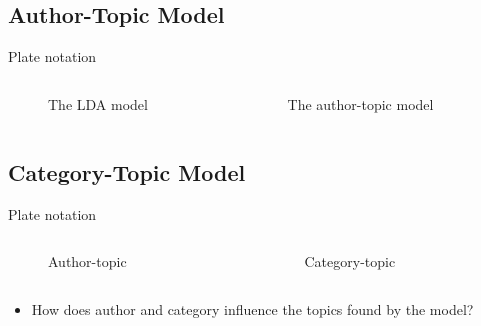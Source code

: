 \subsection{Author-Topic Model}

\begin{frame}{\insertsubsection}{Plate notation}
	\begin{columns}
		\begin{column}{0.45\textwidth}
			\begin{figure}
				\resizebox{\textwidth}{!}{%
				
			}
			\caption*{The LDA model}
			\end{figure}
		\end{column}
		\begin{column}{0.45\textwidth}
			\begin{figure}
				\resizebox{\textwidth}{!}{%
					
				}
				\caption*{The author-topic model}
			\end{figure}
		\end{column}
	\end{columns}
\end{frame}

\subsection{Category-Topic Model}
\begin{frame}{\insertsubsection}{Plate notation}
	\begin{columns}
		\begin{column}{0.45\textwidth}
			\begin{figure}
				\resizebox{\textwidth}{!}{%
					
				}
				\caption*{Author-topic}
			\end{figure}
		\end{column}
		\begin{column}{0.45\textwidth}
			\begin{figure}
				\resizebox{\textwidth}{!}{%
					
				}
				\caption*{Category-topic}
			\end{figure}
		\end{column}
	\end{columns}
\end{frame}

\begin{frame}{\insertsection}{}
	\begin{itemize}
		\item How does author and category influence the topics found by the model?
	\end{itemize}
\end{frame}
